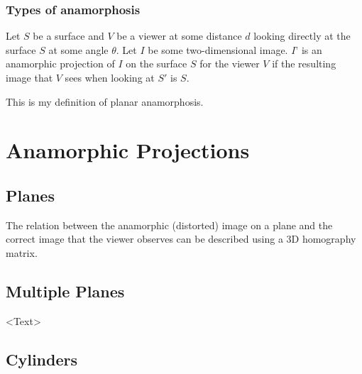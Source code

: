 \documentclass[11pt, oneside, reqno]{book}
\begin{document}




\subsection{Types of anamorphosis}

\begin{definition}
\label{def:perspective}
Let $S$ be a surface and $V$ be a viewer at some distance $d$ looking directly at the surface $S$ at some angle $\theta$. Let $I$ be some two-dimensional image. $I’$ is an anamorphic projection of $I$ on the surface $S$ for the viewer $V$ if the resulting image that $V$ sees when looking at $S'$ is $S$.
\end{definition}

\begin{definition}
\label{def:pla}
This is my definition of planar anamorphosis. 
\end{definition}










\chapter{Anamorphic Projections}
\label{chap:ana}


\section{Planes}
\label{sec:pla}

The relation between the anamorphic (distorted) image on a plane and the correct image that the viewer observes can be described using a 3D homography matrix.

\section{Multiple Planes}
\label{sec:mul}

<Text>

\section{Cylinders}
\label{sec:cyl}
\end{document}
